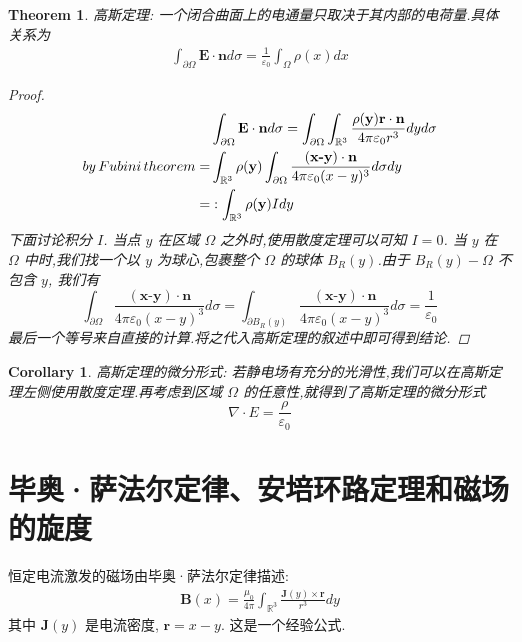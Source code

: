 \documentclass{article}
\newtheorem{theorem}{Theorem}
\newtheorem{corollary}{Corollary}
\begin{document}
\begin{CJK}{UTF8}{gbsn}
\begin{theorem}
	高斯定理: 一个闭合曲面上的电通量只取决于其内部的电荷量.具体关系为
	\begin{align*}
		\int_{\partial\Omega}\textbf{E} \cdot \textbf{n}d\sigma =\frac{1}{\varepsilon_0}\int_{\Omega}\rho(x)dx
	\end{align*}
	\begin{proof}
		\begin{align*}
			&\int_{\partial\Omega}\textbf{E} \cdot \textbf{n}d\sigma=\int_{\partial\Omega}\int_{\mathbb{R}^3}\frac{\rho(\textbf{y})\textbf{\textbf{r}}\cdot\textbf{n}}{4\pi\varepsilon_0 r^3}dy  d\sigma \\
			by\,Fubini\,theorem=&\int_{\mathbb{R}^3}\rho(\textbf{y})\int_{\partial\Omega}\frac{(\textbf{x-y})\cdot\textbf{n}}{4\pi\varepsilon_0 (x-y)^3}d\sigma dy \\
			=&:\int_{\mathbb{R}^3}\rho(\textbf{y})Idy
		\end{align*}
		下面讨论积分 $I$. 当点 $y$ 在区域 $\Omega$ 之外时,使用散度定理可以可知 $I=0$. 当 $y$ 在 $\Omega$ 中时,我们找一个以 $y$ 为球心,包裹整个 $\Omega $ 的球体 $B_R(y)$.由于 $B_R(y)-\Omega$ 不包含 $y$, 我们有
		$$\int_{\partial\Omega}\frac{(\textbf{x-y})\cdot\textbf{n}}{4\pi\varepsilon_0 (x-y)^3}d\sigma=\int_{\partial B_R(y)}\frac{(\textbf{x-y})\cdot\textbf{n}}{4\pi\varepsilon_0 (x-y)^3}d\sigma=\frac{1}{\varepsilon_0}$$
			最后一个等号来自直接的计算.将之代入高斯定理的叙述中即可得到结论.
	\end{proof}

\end{theorem}

\begin{corollary}
	高斯定理的微分形式: 若静电场有充分的光滑性,我们可以在高斯定理左侧使用散度定理.再考虑到区域 $\Omega$ 的任意性,就得到了高斯定理的微分形式
	$$\nabla\cdot E= \frac{\rho}{\varepsilon_0}$$
\end{corollary}



\section{毕奥·萨法尔定律、安培环路定理和磁场的旋度}

恒定电流激发的磁场由毕奥·萨法尔定律描述:
\begin{align*}
	\textbf{B}(x)=\frac{\mu_0}{4\pi}\int_{\mathbb{R}^3}\frac{\textbf{J}(y)\times \textbf{r}}{r^3}dy
\end{align*}
其中 $\textbf{J}(y)$ 是电流密度, $\textbf{r}=x-y$.	这是一个经验公式.








\end{CJK}
\end{document}
